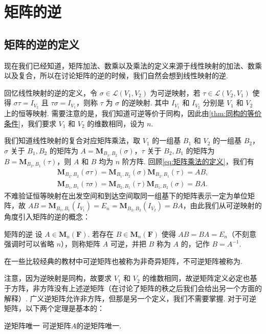 \section{矩阵的逆}

\subsection{矩阵的逆的定义}

现在我们已经知道，矩阵加法、数乘以及乘法的定义来源于线性映射的加法、数乘以及复合，所以在讨论矩阵的逆的时候，我们自然会想到线性映射的逆.

回忆线性映射的逆的定义，令 $\sigma \in \mathcal{L}(V_1,V_2)$ 为可逆映射，若 $\tau \in \mathcal{L}(V_2,V_1)$ 使得 $\sigma \tau = I_{V_2}$ 且 $\tau \sigma = I_{V_1}$，则称 $\tau$ 为 $\sigma$ 的逆映射. 其中 $I_{V_1}$ 和 $I_{V_2}$ 分别是 $V_1$ 和 $V_2$ 上的恒等映射. 需要注意的是，我们知道可逆等价于同构，因此由\autoref{thm:同构的等价条件}，我们要求 $V_1$ 和 $V_2$ 的维数相同，设为 $n$.

我们知道线性映射的复合对应矩阵乘法，取 $V_1$ 的一组基 $B_1$ 和 $V_2$ 的一组基 $B_2$，$\sigma$ 关于 $B_1,B_2$ 的矩阵为 $A = \mathbf{M}_{B_1,B_2}(\sigma)$，$\tau$ 关于 $B_2,B_1$ 的矩阵为 $B = \mathbf{M}_{B_2,B_1}(\tau)$，则 $A$ 和 $B$ 均为 $n$ 阶方阵. 回顾\autoref{eq:矩阵乘法的定义}，我们有
\begin{gather*}
    \mathbf{M}_{B_2,B_2}(\sigma\tau)=\mathbf{M}_{B_1,B_2}(\sigma)\mathbf{M}_{B_2,B_1}(\tau) = AB, \\
    \mathbf{M}_{B_1,B_1}(\tau\sigma)=\mathbf{M}_{B_2,B_1}(\tau)\mathbf{M}_{B_1,B_2}(\sigma) = BA.
\end{gather*}
不难验证恒等映射在出发空间和到达空间取同一组基下的矩阵表示一定为单位矩阵，故 $AB = \mathbf{M}_{B_1,B_1}(I_{V_1}) = E_n = \mathbf{M}_{B_2,B_2}(I_{V_2}) = BA$，由此我们从可逆映射的角度引入矩阵的逆的概念：
\begin{definition}{矩阵的逆}{}
    设 $A \in \mathbf{M}_n(\mathbf{F})$. 若存在 $B \in \mathbf{M}_n(\mathbf{F})$ 使得 $AB = BA = E_n$（不刻意强调时可以省略 $n$），则称矩阵 $A$ 可逆，并把 $B$ 称为 $A$ 的，记作 $B = A^{-1}$.
\end{definition}
在一些比较经典的教材中可逆矩阵也被称为非奇异矩阵，不可逆矩阵被称为.

注意，因为逆映射是同构，故要求 $V_1$ 和 $V_2$ 的维数相同，故逆矩阵定义必定也基于方阵，非方阵没有上述逆矩阵（在讨论了矩阵的秩之后我们会给出另一个方面的解释）. 广义逆矩阵允许非方阵，但那是另一个定义，我们不需要掌握. 对于可逆矩阵，以下两个定理是基本的：
\begin{theorem}{}{逆矩阵唯一}
    可逆矩阵$A$的逆矩阵唯一.
\end{theorem}

